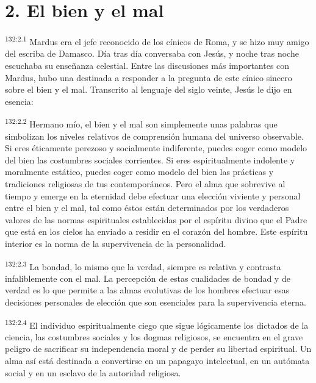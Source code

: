 \section*{2. El bien y el mal}
\par
\textsuperscript{132:2.1} Mardus era el jefe reconocido de los cínicos de Roma, y se hizo muy amigo del escriba de Damasco. Día tras día conversaba con Jesús, y noche tras noche escuchaba su enseñanza celestial. Entre las discusiones más importantes con Mardus, hubo una destinada a responder a la pregunta de este cínico sincero sobre el bien y el mal. Transcrito al lenguaje del siglo veinte, Jesús le dijo en esencia:

\par
\textsuperscript{132:2.2} Hermano mío, el bien y el mal son simplemente unas palabras que simbolizan los niveles relativos de comprensión humana del universo observable. Si eres éticamente perezoso y socialmente indiferente, puedes coger como modelo del bien las costumbres sociales corrientes. Si eres espiritualmente indolente y moralmente estático, puedes coger como modelo del bien las prácticas y tradiciones religiosas de tus contemporáneos. Pero el alma que sobrevive al tiempo y emerge en la eternidad debe efectuar una elección viviente y personal entre el bien y el mal, tal como éstos están determinados por los verdaderos valores de las normas espirituales establecidas por el espíritu divino que el Padre que está en los cielos ha enviado a residir en el corazón del hombre. Este espíritu interior es la norma de la supervivencia de la personalidad.

\par
\textsuperscript{132:2.3} La bondad, lo mismo que la verdad, siempre es relativa y contrasta infaliblemente con el mal. La percepción de estas cualidades de bondad y de verdad es lo que permite a las almas evolutivas de los hombres efectuar esas decisiones personales de elección que son esenciales para la supervivencia eterna.

\par
\textsuperscript{132:2.4} El individuo espiritualmente ciego que sigue lógicamente los dictados de la ciencia, las costumbres sociales y los dogmas religiosos, se encuentra en el grave peligro de sacrificar su independencia moral y de perder su libertad espiritual. Un alma así está destinada a convertirse en un papagayo intelectual, en un autómata social y en un esclavo de la autoridad religiosa.

